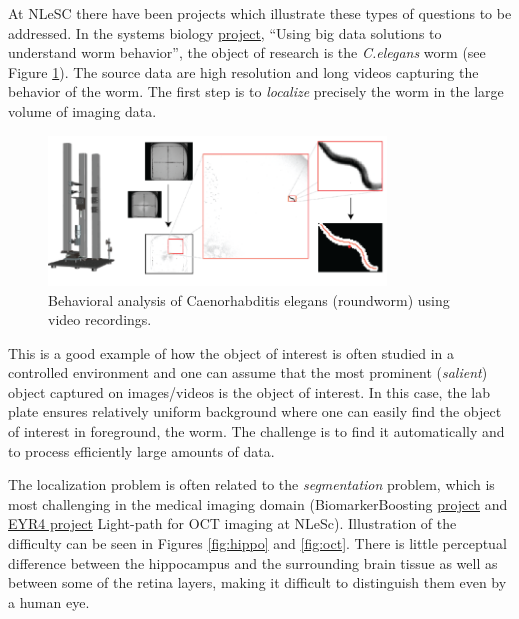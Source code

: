  At NLeSC there have been projects which illustrate these types of questions to be addressed. In the systems biology  \href{https://blog.surf.nl/en/eyr4-blog-5-using-big-data-solutions-to-understand-worm-behavior/}{\underline{project}}, ``Using big data solutions to understand worm behavior'', the object of research is the {\em C.elegans} worm (see Figure \ref{fig:Celegans}). The source data are high resolution and long videos capturing the behavior of the worm. The first step is to {\em localize} precisely the worm in the large volume of imaging data. 
\begin{figure}[H]
\begin{center}
\includegraphics[width=0.8\textwidth]{fig/Celegans}
\end{center}
\caption{Behavioral analysis of Caenorhabditis elegans (roundworm) using video recordings.}
\label{fig:Celegans}
\end{figure}
This is a good example of how the object of interest is often studied in a controlled environment and one can assume that the most prominent ({\em salient}) object captured on images/videos is the object of interest. In this case, the lab plate ensures relatively uniform background where one can easily find the object of interest in foreground, the worm. The challenge is to find it automatically and to process efficiently large amounts of data.

The localization problem is often related to the {\em segmentation} problem, which is most challenging in the medical imaging domain (BiomarkerBoosting \href{https://www.esciencecenter.nl/project/biomarker-boosting}{\underline{project}} and \href{https://blog.surf.nl/eyr4-blog-7-lightpath-optical-coherence-tomography-oct-imaging/}{\underline{EYR4 project}} Light-path for OCT imaging at NLeSc). Illustration of the difficulty can be seen in Figures \ref{fig:hippo} and \ref{fig:oct}. There is little perceptual difference between the hippocampus and the surrounding brain tissue as well as between some of the retina layers, making it difficult to distinguish them even by a human eye.

